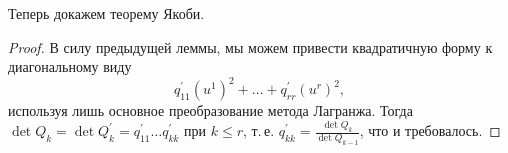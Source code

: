 Теперь докажем теорему Якоби.

\begin{proof}
    В силу предыдущей леммы, мы можем привести квадратичную форму к диагональному виду
    \[
        q^\prime_{11}(u^1)^2 + \ldots + q^\prime_{rr}(u^r)^2,
    \]
    используя лишь основное преобразование метода Лагранжа. Тогда $\det Q_k = \det Q^\prime_k = q^\prime_{11}\ldots q^\prime_{kk}$ при $k \leqslant r$, т.\,е. $q^\prime_{kk} = \frac{\det Q_k}{\det Q_{k - 1}}$, что и требовалось.
\end{proof}

